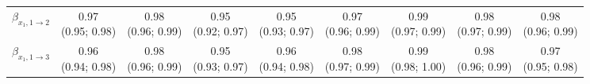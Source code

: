 \begin{table*}[htbp]
\begin{sideways}
\begin{tabular}{lcccccccc}
$\beta_{x_1,1\rightarrow 2}$ & \makecell[t]{0.97\\(0.95; 0.98)} & \makecell[t]{0.98\\(0.96; 0.99)} & \makecell[t]{0.95\\(0.92; 0.97)} & \makecell[t]{0.95\\(0.93; 0.97)} & \makecell[t]{0.97\\(0.96; 0.99)} & \makecell[t]{0.99\\(0.97; 0.99)} & \makecell[t]{0.98\\(0.97; 0.99)} & \makecell[t]{0.98\\(0.96; 0.99)} \\
$\beta_{x_1,1\rightarrow 3}$ & \makecell[t]{0.96\\(0.94; 0.98)} & \makecell[t]{0.98\\(0.96; 0.99)} & \makecell[t]{0.95\\(0.93; 0.97)} & \makecell[t]{0.96\\(0.94; 0.98)} & \makecell[t]{0.98\\(0.97; 0.99)} & \makecell[t]{0.99\\(0.98; 1.00)} & \makecell[t]{0.98\\(0.96; 0.99)} & \makecell[t]{0.97\\(0.95; 0.98)} \\
\bottomrule
\end{tabular}
\normalsize
\end{sideways}
\end{table*}
